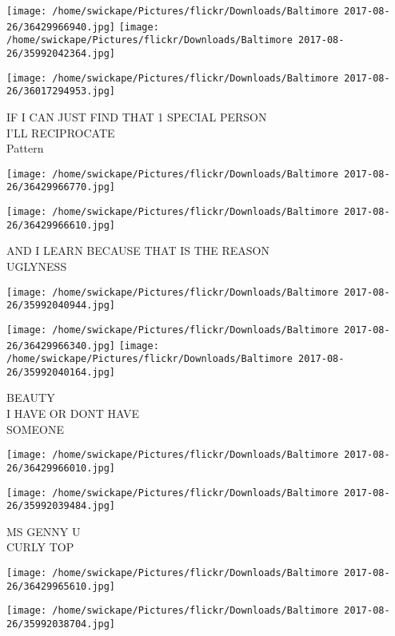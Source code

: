 \documentclass[10pt,letterpaper]{article}
\begin{document}
\texttt{[image: /home/swickape/Pictures/flickr/Downloads/Baltimore 2017-08-26/36429966940.jpg]}
\texttt{[image: /home/swickape/Pictures/flickr/Downloads/Baltimore 2017-08-26/35992042364.jpg]}

\texttt{[image: /home/swickape/Pictures/flickr/Downloads/Baltimore 2017-08-26/36017294953.jpg]}

IF I CAN JUST FIND THAT 1 SPECIAL PERSON\\
I'LL RECIPROCATE\\
Pattern\\
\pagebreak

\texttt{[image: /home/swickape/Pictures/flickr/Downloads/Baltimore 2017-08-26/36429966770.jpg]}

\vspace{0.25in}
\texttt{[image: /home/swickape/Pictures/flickr/Downloads/Baltimore 2017-08-26/36429966610.jpg]}

AND I LEARN BECAUSE THAT IS THE REASON\\
UGLYNESS\\
\pagebreak

\texttt{[image: /home/swickape/Pictures/flickr/Downloads/Baltimore 2017-08-26/35992040944.jpg]}

\vspace{0.25in}
\texttt{[image: /home/swickape/Pictures/flickr/Downloads/Baltimore 2017-08-26/36429966340.jpg]}
\texttt{[image: /home/swickape/Pictures/flickr/Downloads/Baltimore 2017-08-26/35992040164.jpg]}

BEAUTY\\
I HAVE OR DONT HAVE\\
SOMEONE\\
\pagebreak

\texttt{[image: /home/swickape/Pictures/flickr/Downloads/Baltimore 2017-08-26/36429966010.jpg]}

\vspace{0.25in}
\texttt{[image: /home/swickape/Pictures/flickr/Downloads/Baltimore 2017-08-26/35992039484.jpg]}

MS GENNY U\\
CURLY TOP\\
\pagebreak

\texttt{[image: /home/swickape/Pictures/flickr/Downloads/Baltimore 2017-08-26/36429965610.jpg]}

\vspace{0.25in}
\texttt{[image: /home/swickape/Pictures/flickr/Downloads/Baltimore 2017-08-26/35992038704.jpg]}
\end{document}
